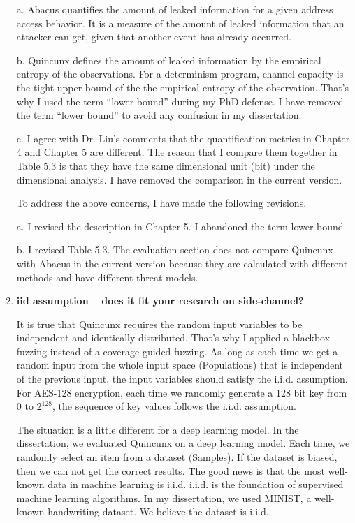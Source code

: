 \documentclass{article}
\begin{document}
\begin{enumerate}
a. Abacus quantifies the amount of leaked information for a given address access behavior. It is a measure of the amount of leaked information that an attacker can get, given that another event has already occurred. 

b. Quincunx defines the amount of leaked information by the empirical entropy of the observations. For a determinism program, channel capacity is the tight upper bound of the the empirical entropy of the observation. That's why I used the term ``lower bound'' during my PhD defense. I have removed the term ``lower bound'' to avoid any confusion in my dissertation.

c. I agree with Dr. Liu's comments that the quantification metrics in Chapter 4 and Chapter 5 are different. The reason that I compare them together in Table 5.3 is that they have the same dimensional unit (bit) under the dimensional analysis. I have removed the comparison in the current version.

To address the above concerns, I have made the following revisions.

a. I revised the description in Chapter 5. I abandoned the term lower bound.

b. I revised Table 5.3. The evaluation section does not compare Quincunx with Abacus in the current version because they are calculated with different methods and have different threat models.
\item \textbf{iid assumption – does it fit your research on side-channel?}

It is true that Quincunx requires the random input variables to be independent and identically distributed. That's why I applied a blackbox fuzzing instead of a coverage-guided fuzzing. As long as each time we get a random input from the whole input space (Populations) that is independent of the previous input, the input variables should satisfy the i.i.d. assumption. For AES-128 encryption, each time we randomly generate a 128 bit key from $0$ to $2^{128}$, the sequence of key values follows the i.i.d. assumption.

The situation is a little different for a deep learning model. In the dissertation, we evaluated Quincunx on a deep learning model. Each time, we randomly select an item from a dataset (Samples). If the dataset is biased, then we can not get the correct results. The good news is that the most well-known data in machine learning is i.i.d. i.i.d. is the foundation of supervised machine learning algorithms. In my dissertation, we used MINIST, a well-known handwriting dataset. We believe the dataset is i.i.d.


\end{enumerate}
\end{document}
